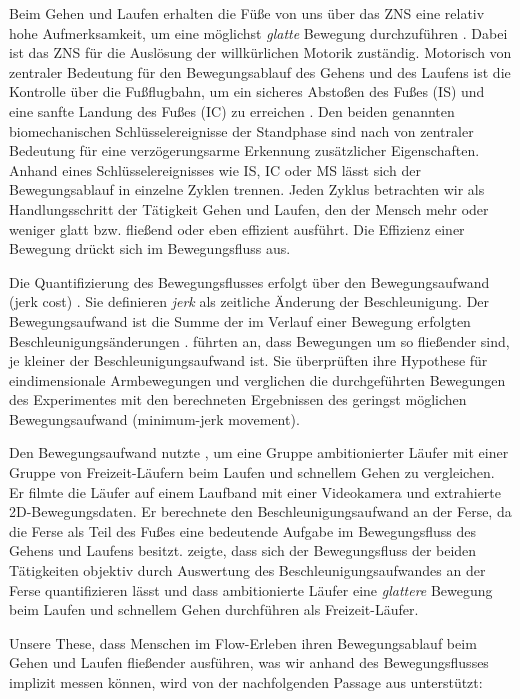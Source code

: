 Beim Gehen und Laufen erhalten die Füße von uns über das \acs{ZNS} eine relativ hohe Aufmerksamkeit, um eine möglichst \emph{glatte} Bewegung durchzuführen \citep[][S.~193]{Brooks1986}. Dabei ist das \acs{ZNS} für die Auslösung der willkürlichen Motorik zuständig. Motorisch von zentraler Bedeutung für den Bewegungsablauf des Gehens und des Laufens ist die Kontrolle über die Fußflugbahn, um ein sicheres Abstoßen des Fußes (\ac{IS}) und eine sanfte Landung des Fußes (\ac{IC}) zu erreichen \citep[][S.~197]{Winter1989}. Den beiden genannten biomechanischen Schlüsselereignisse der Standphase sind nach \citet{Aminian2002, Lee2011} von zentraler Bedeutung für eine verzögerungsarme Erkennung zusätzlicher Eigenschaften. Anhand eines Schlüsselereignisses wie \ac{IS}, \ac{IC} oder \ac{MS} lässt sich der Bewegungsablauf in einzelne Zyklen trennen. Jeden Zyklus betrachten wir als Handlungsschritt der Tätigkeit Gehen und Laufen, den der Mensch mehr oder weniger glatt bzw. fließend oder eben effizient ausführt. Die Effizienz einer Bewegung drückt sich im Bewegungsfluss aus. 

Die Quantifizierung des Bewegungsflusses erfolgt über den Bewegungsaufwand (jerk cost) \citep{Nelson1983, Hogan1984, Flash1985}. Sie definieren \emph{jerk} als zeitliche Änderung der Beschleunigung. Der Bewegungsaufwand ist die Summe der im Verlauf einer Bewegung erfolgten Beschleunigungsänderungen \citep{Schneider1990}. \citet[][S.~1698]{Flash1985} führten an, dass Bewegungen um so fließender sind, je kleiner der Beschleunigungsaufwand ist. Sie überprüften ihre Hypothese für eindimensionale Armbewegungen und verglichen die durchgeführten Bewegungen des Experimentes mit den berechneten Ergebnissen des geringst möglichen Bewegungsaufwand (minimum-jerk movement).

Den Bewegungsaufwand nutzte \citet{Hreljac2000}, um eine Gruppe ambitionierter Läufer mit einer Gruppe von Freizeit-Läufern beim Laufen und schnellem Gehen zu vergleichen. Er filmte die Läufer auf einem Laufband mit einer Videokamera und extrahierte 2D-Bewegungsdaten. Er berechnete den Beschleunigungsaufwand an der Ferse, da die Ferse als Teil des Fußes eine bedeutende Aufgabe im Bewegungsfluss des Gehens und Laufens besitzt. \citet{Hreljac2000} zeigte, dass sich der Bewegungsfluss der beiden Tätigkeiten objektiv durch Auswertung des Beschleunigungsaufwandes an der Ferse quantifizieren lässt und dass ambitionierte Läufer eine \emph{glattere} Bewegung beim Laufen und schnellem Gehen durchführen als Freizeit-Läufer.

Unsere These, dass Menschen im Flow-Erleben ihren Bewegungsablauf beim Gehen und Laufen fließender ausführen, was wir anhand des Bewegungsflusses implizit messen können, wird von der nachfolgenden Passage aus \citet[][S.~121]{Meinel2007} unterstützt:

